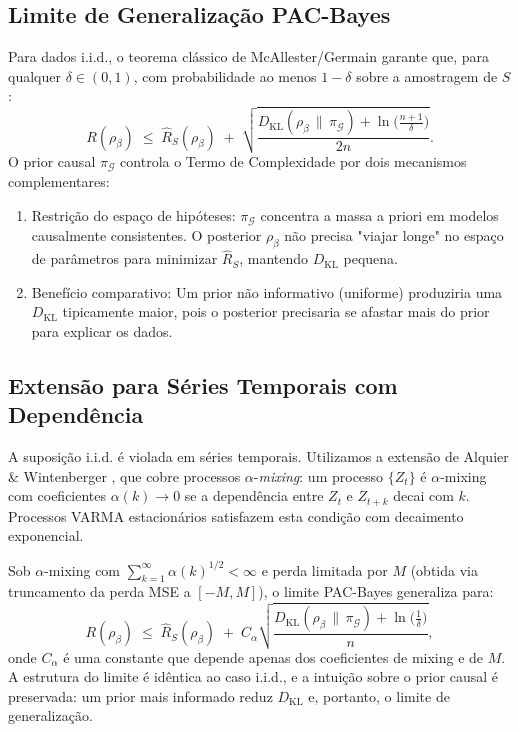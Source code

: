 \documentclass[12pt, a4paper]{article}
\begin{document}
\subsection{Limite de Generalização PAC-Bayes}

Para dados i.i.d., o teorema clássico de McAllester/Germain \cite{alquier2024} garante que, para qualquer $\delta \in (0,1)$, com probabilidade ao menos $1-\delta$ sobre a amostragem de $S$:
\[
R(\rho_{\beta}) \;\le\; \hat{R}_S(\rho_{\beta}) \;+\; \sqrt{ \frac{ D_{\mathrm{KL}}(\rho_{\beta}\,\|\,\pi_{\mathcal G}) + \ln\bigl(\frac{n+1}{\delta}\bigr) }{2n} }.
\]
O prior causal $\pi_{\mathcal G}$ controla o Termo de Complexidade por dois mecanismos complementares:
\begin{enumerate}
    \item Restrição do espaço de hipóteses: $\pi_{\mathcal G}$ concentra a massa a priori em modelos causalmente consistentes. O posterior $\rho_{\beta}$ não precisa "viajar longe" no espaço de parâmetros para minimizar $\hat{R}_S$, mantendo $D_{\mathrm{KL}}$ pequena.
    \item Benefício comparativo: Um prior não informativo (uniforme) produziria uma $D_{\mathrm{KL}}$ tipicamente maior, pois o posterior precisaria se afastar mais do prior para explicar os dados.
\end{enumerate}

\subsection{Extensão para Séries Temporais com Dependência}

A suposição i.i.d. é violada em séries temporais. Utilizamos a extensão de Alquier \& Wintenberger \cite{alquier2012mixing}, que cobre processos $\alpha$-\emph{mixing}: um processo $\{Z_t\}$ é $\alpha$-mixing com coeficientes $\alpha(k) \to 0$ se a dependência entre $Z_t$ e $Z_{t+k}$ decai com $k$. Processos VARMA estacionários satisfazem esta condição com decaimento exponencial.

Sob $\alpha$-mixing com $\sum_{k=1}^{\infty} \alpha(k)^{1/2} < \infty$ e perda limitada por $M$ (obtida via truncamento da perda MSE a $[-M, M]$), o limite PAC-Bayes generaliza para:
\[
R(\rho_{\beta}) \;\le\; \hat{R}_S(\rho_{\beta}) \;+\; C_{\alpha} \sqrt{ \frac{ D_{\mathrm{KL}}(\rho_{\beta}\,\|\,\pi_{\mathcal G}) + \ln\bigl(\frac{1}{\delta}\bigr) }{n} },
\]
onde $C_{\alpha}$ é uma constante que depende apenas dos coeficientes de mixing e de $M$. A estrutura do limite é idêntica ao caso i.i.d., e a intuição sobre o prior causal é preservada: um prior mais informado reduz $D_{\mathrm{KL}}$ e, portanto, o limite de generalização.
\end{document}
